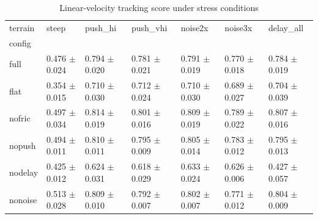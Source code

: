 \begin{table}
\caption{Linear-velocity tracking score under stress conditions}
\label{tab:tab_lin_stress}
\begin{tabular}{lllllll}
\toprule
terrain & steep & push_hi & push_vhi & noise2x & noise3x & delay_all \\
config &  &  &  &  &  &  \\
\midrule
full & 0.476 $\pm$ 0.024 & 0.794 $\pm$ 0.020 & 0.781 $\pm$ 0.021 & 0.791 $\pm$ 0.019 & 0.770 $\pm$ 0.018 & 0.784 $\pm$ 0.019 \\
flat & 0.354 $\pm$ 0.015 & 0.710 $\pm$ 0.030 & 0.712 $\pm$ 0.024 & 0.710 $\pm$ 0.030 & 0.689 $\pm$ 0.027 & 0.704 $\pm$ 0.039 \\
nofric & 0.497 $\pm$ 0.034 & 0.814 $\pm$ 0.019 & 0.801 $\pm$ 0.016 & 0.809 $\pm$ 0.019 & 0.789 $\pm$ 0.022 & 0.807 $\pm$ 0.016 \\
nopush & 0.494 $\pm$ 0.011 & 0.810 $\pm$ 0.011 & 0.795 $\pm$ 0.009 & 0.805 $\pm$ 0.014 & 0.783 $\pm$ 0.012 & 0.795 $\pm$ 0.013 \\
nodelay & 0.425 $\pm$ 0.012 & 0.624 $\pm$ 0.031 & 0.618 $\pm$ 0.029 & 0.633 $\pm$ 0.024 & 0.626 $\pm$ 0.006 & 0.427 $\pm$ 0.057 \\
nonoise & 0.513 $\pm$ 0.028 & 0.809 $\pm$ 0.010 & 0.792 $\pm$ 0.007 & 0.802 $\pm$ 0.007 & 0.771 $\pm$ 0.012 & 0.804 $\pm$ 0.009 \\
\bottomrule
\end{tabular}
\end{table}
